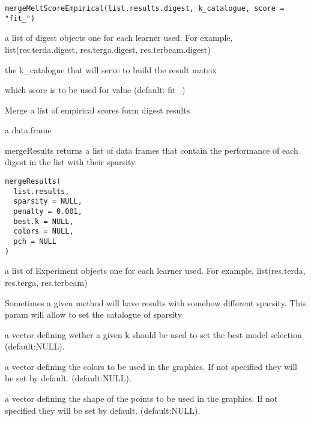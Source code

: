 \documentclass[a4paper]{book}
\begin{document}
%
\begin{Usage}
\begin{verbatim}
mergeMeltScoreEmpirical(list.results.digest, k_catalogue, score = "fit_")
\end{verbatim}
\end{Usage}
%
\begin{Arguments}
\begin{ldescription}
\item[\code{list.results.digest:}] a list of digest objects one for each learner used. For example, list(res.terda.digest, res.terga.digest, res.terbeam.digest)

\item[\code{k\_catalogue:}] the k\_catalogue that will serve to build the result matrix

\item[\code{score:}] which score is to be used for value (default: fit\_)
\end{ldescription}
\end{Arguments}
%
\begin{Details}
Merge a list of empirical scores form digest results
\end{Details}
%
\begin{Value}
a data.frame
\end{Value}
%
\begin{Description}
mergeResults returns a list of data frames that contain the performance of each digest in the list with their sparsity.
\end{Description}
%
\begin{Usage}
\begin{verbatim}
mergeResults(
  list.results,
  sparsity = NULL,
  penalty = 0.001,
  best.k = NULL,
  colors = NULL,
  pch = NULL
)
\end{verbatim}
\end{Usage}
%
\begin{Arguments}
\begin{ldescription}
\item[\code{list.results:}] a list of Experiment objects one for each learner used. For example, list(res.terda, res.terga, res.terbeam)

\item[\code{sparsity:}] Sometimes a given method will have results with somehow different sparsity. This param will allow to set the catalogue of sparsity

\item[\code{best.k:}] a vector defining wether a given k should be used to set the best model selection (default:NULL).

\item[\code{colors:}] a vector defining the colors to be used in the graphics. If not specified they will be set by default. (default:NULL).

\item[\code{pch:}] a vector defining the shape of the points to be used in the graphics. If not specified they will be set by default. (default:NULL).
\end{ldescription}
\end{Arguments}
\end{document}
